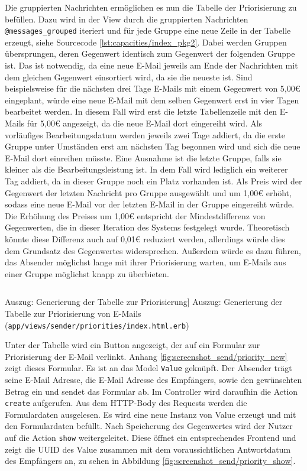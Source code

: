 \noindent Die gruppierten Nachrichten ermöglichen es nun die Tabelle der Priorisierung zu befüllen. Dazu wird in der View durch die gruppierten Nachrichten \texttt{@messages\_grouped} iteriert und für jede Gruppe eine neue Zeile in der Tabelle erzeugt, siehe Sourcecode \ref{lst:capacities/index_pkg2}. Dabei werden Gruppen übersprungen, deren Gegenwert identisch zum Gegenwert der folgenden Gruppe ist. Das ist notwendig, da eine neue E-Mail jeweils am Ende der Nachrichten mit dem gleichen Gegenwert einsortiert wird, da sie die neueste ist. Sind beispielsweise für die nächsten drei Tage E-Mails mit einem Gegenwert von 5,00€ eingeplant, würde eine neue E-Mail mit dem selben Gegenwert erst in vier Tagen bearbeitet werden. In diesem Fall wird erst die letzte Tabellenzeile mit den E-Mails für 5,00€ angezeigt, da die neue E-Mail dort eingereiht wird. Als vorläufiges Bearbeitungsdatum werden jeweils zwei Tage addiert, da die erste Gruppe unter Umständen erst am nächsten Tag begonnen wird und sich die neue E-Mail dort einreihen müsste. Eine Ausnahme ist die letzte Gruppe, falls sie kleiner als die Bearbeitungsleistung ist. In dem Fall wird lediglich ein weiterer Tag addiert, da in dieser Gruppe noch ein Platz vorhanden ist. Als Preis wird der Gegenwert der letzten Nachricht pro Gruppe ausgewählt und um 1,00€ erhöht, sodass eine neue E-Mail vor der letzten E-Mail in der Gruppe eingereiht würde. Die Erhöhung des Preises um 1,00€ entspricht der Mindestdifferenz von Gegenwerten, die in dieser Iteration des Systems festgelegt wurde. Theoretisch könnte diese Differenz auch auf 0,01€ reduziert werden, allerdings würde dies dem Grundsatz des Gegenwertes widersprechen. Außerdem würde es dazu führen, das Absender möglichst lange mit ihrer Priorisierung warten, um E-Mails aus einer Gruppe möglichst knapp zu überbieten.

\begin{listing}[!ht]
\inputminted[firstline=26, lastline=39, linenos]{erb}{Listings/Pkg2/priorities_index.html.erb}

\caption
    [Auszug: Generierung der Tabelle zur Priorisierung]
    {Auszug: Generierung der Tabelle zur Priorisierung von E-Mails (\texttt{app/views/sender/priorities/index.html.erb})}

\label{lst:capacities/index_pkg2}
\end{listing}

\noindent Unter der Tabelle wird ein Button angezeigt, der auf ein Formular zur Priorisierung der E-Mail verlinkt. Anhang \ref{fig:screenshot_send/priority_new} zeigt dieses Formular. Es ist an das Model \texttt{Value} geknüpft. Der Absender trägt seine E-Mail Adresse, die E-Mail Adresse des Empfängers, sowie den gewünschten Betrag ein und sendet das Formular ab. Im Controller wird daraufhin die Action \texttt{create} aufgerufen. Aus dem HTTP-Body des Requests werden die Formulardaten ausgelesen. Es wird eine neue Instanz von Value erzeugt und mit den Formulardaten befüllt. Nach Speicherung des Gegenwertes wird der Nutzer auf die Action \texttt{show} weitergeleitet. Diese öffnet ein entsprechendes Frontend und zeigt die UUID des Value zusammen mit dem voraussichtlichen Antwortdatum des Empfängers an, zu sehen in Abbildung \ref{fig:screenshot_send/priority_show}.

